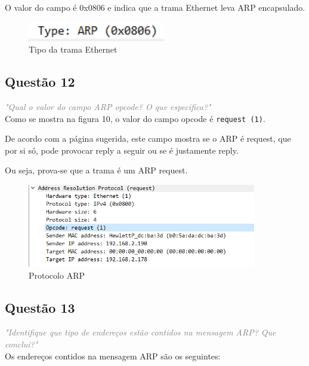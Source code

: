 \documentclass{llncs}
\newcommand{\questionE}[1]{\textcolor{gray}{\textit{"#1"}}}
\begin{document}
O valor do campo é 0x0806 e indica que a trama Ethernet leva ARP encapsulado.

\begin{figure}[H]
\begin{center}
\includegraphics[width=6cm]{11.PNG}
\end{center}
\caption{Tipo da trama Ethernet}
\end{figure}

\clearpage

\subsection{Questão 12}
\hspace{3mm} 
\questionE{Qual	o valor do campo ARP opcode? O que especifica?}\\

Como se mostra na figura 10, o valor do campo opcode é \texttt{request (1)}.

De acordo com a página sugerida, este campo mostra se o ARP é request, que por si só, pode provocar reply a seguir ou se é justamente reply.

Ou seja, prova-se que a trama é um ARP request.

\begin{figure}[H]
\begin{center}
\includegraphics[width=10cm]{12.PNG}
\end{center}
\caption{Protocolo ARP}
\end{figure}

\subsection{Questão 13}
\hspace{3mm} 
\questionE{Identifique que tipo de endereços estão contidos na mensagem ARP? Que conclui?}\\

Os endereços contidos na mensagem ARP são os seguintes:
\end{document}
